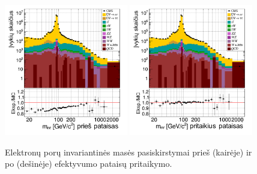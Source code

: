 \documentclass[a4paper, 12pt, oneside]{article}
\begin{document}
\begin{figure}[t!]
	\includegraphics[width=0.48\textwidth]{Magistrinis/ee_mass_before.png}
	\includegraphics[width=0.48\textwidth]{Magistrinis/ee_mass_after.png}
	\vspace{-0.6cm}
	\caption{\label{fig:invMba_ee} Elektronų porų invariantinės masės pasiskirstymai prieš (kairėje) ir po (dešinėje)
	efektyvumo pataisų pritaikymo.}
\end{figure}
\end{document}
